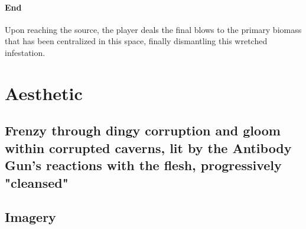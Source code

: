 \documentclass[letterpaper]{report}
\begin{document}
			\paragraph{End} Upon reaching the source, the player deals the final blows to the primary biomass that has been centralized in this space, finally dismantling this wretched infestation.
		\section{Aesthetic}
			\subsection{Frenzy through dingy corruption and gloom within corrupted caverns, lit by the Antibody Gun's reactions with the flesh, progressively "cleansed"}
			\subsection{Imagery}
\end{document}
